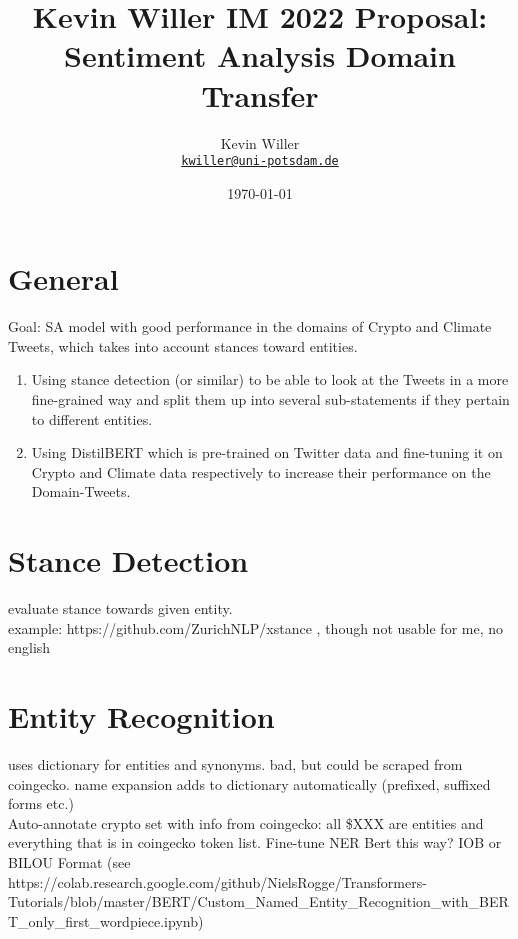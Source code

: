\documentclass[11pt]{article}
\title{Kevin Willer IM 2022 Proposal: Sentiment Analysis Domain Transfer}
\author{Kevin Willer\\%
    \href{mailto:kwiller@uni-potsdam.de}{\texttt{kwiller@uni-potsdam.de}} %
    }
\date{\today}
\begin{document}
\section{General}
{
\maketitle

Goal: SA model with good performance in the domains of Crypto and Climate Tweets, which takes into account stances toward entities.

\begin{enumerate}
        \item Using stance detection (or similar) to be able to look at the Tweets in a more fine-grained way and split them up into several sub-statements if they pertain to different entities.

        \item Using DistilBERT \citet{distilbert} which is pre-trained on Twitter data and fine-tuning it on Crypto and Climate data respectively to increase their performance on the Domain-Tweets.
\end{enumerate}

\section{Stance Detection}

evaluate stance towards given entity. \\
example: https://github.com/ZurichNLP/xstance , though not usable for me, no english \\

\section{Entity Recognition}

uses dictionary for entities and synonyms. bad, but could be scraped from coingecko.
name expansion adds to dictionary automatically (prefixed, suffixed forms etc.) \\

Auto-annotate crypto set with info from coingecko: all \$XXX are entities and everything that is in coingecko token list. Fine-tune NER Bert this way? IOB or BILOU Format (see https://colab.research.google.com/github/NielsRogge/Transformers-Tutorials/blob/master/BERT/Custom_Named_Entity_Recognition_with_BERT_only_first_wordpiece.ipynb) \\

}
\end{document}
